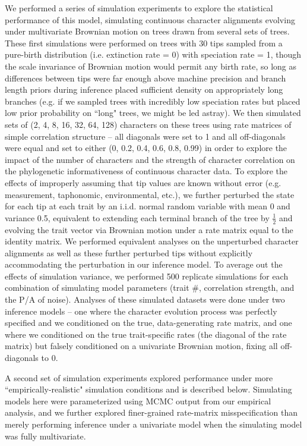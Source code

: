 \documentclass[10pt, twocolumn, twoside]{article}
\begin{document}
We performed a series of simulation experiments to explore the statistical performance of this model, simulating continuous character alignments evolving under multivariate Brownian motion on trees drawn from several sets of trees. These first simulations were performed on trees with 30 tips sampled from a pure-birth \citep{yuleMathematicalTheoryEvolution1925} distribution (i.e. extinction rate = 0) with speciation rate = 1, though the scale invariance of Brownian motion would permit any birth rate, so long as differences between tips were far enough above machine precision and branch length priors during inference placed sufficient density on appropriately long branches (e.g. if we sampled trees with incredibly low speciation rates but placed low prior probability on ``long" trees, we might be led astray). We then simulated sets of (2, 4, 8, 16, 32, 64, 128) characters on these trees using rate matrices of simple correlation structure – all diagonals were set to 1 and all off-diagonals were equal and set to either (0, 0.2, 0.4, 0.6, 0.8, 0.99) in order to explore the impact of the number of characters and the strength of character correlation on the phylogenetic informativeness of continuous character data. To explore the effects of improperly assuming that tip values are known without error (e.g. measurement, taphonomic, environmental, etc.), we further perturbed the state for each tip at each trait by an i.i.d. normal random variable with mean 0 and variance 0.5, equivalent to extending each terminal branch of the tree by $\frac{1}{2}$ and evolving the trait vector via Brownian motion under a rate matrix equal to the identity matrix. We performed equivalent analyses on the unperturbed character alignments as well as these further perturbed tips without explicitly accommodating the perturbation in our inference model. To average out the effects of simulation variance, we performed 500 replicate simulations for each combination of simulating model parameters (trait \#, correlation strength, and the P/A of noise). Analyses of these simulated datasets were done under two inference models -- one where the character evolution process was perfectly specified and we conditioned on the true, data-generating rate matrix, and one where we conditioned on the true trait-specific rates (the diagonal of the rate matrix) but falsely conditioned on a univariate Brownian motion, fixing all off-diagonals to 0.

A second set of simulation experiments explored performance under more ``empirically-realistic" simulation conditions and is described below. Simulating models here were parameterized using MCMC output from our empirical analysis, and we further explored finer-grained rate-matrix misspecification than merely performing inference under a univariate model when the simulating model was fully multivariate.
\end{document}
